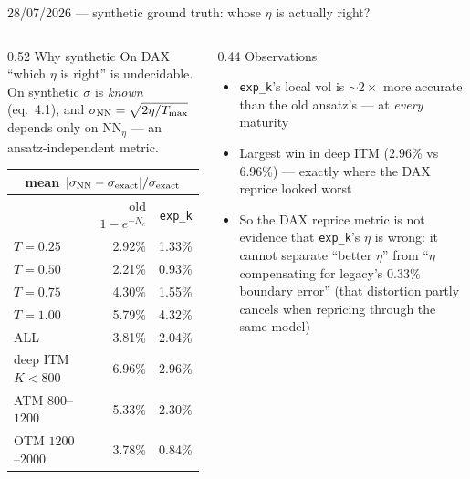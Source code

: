 \documentclass[aspectratio=169,11pt]{beamer}
\newcommand{\gold}[1]{{\color{ntugold}#1}}
\newcommand{\red}[1]{{\color{ntured}#1}}
\begin{document}
\begin{frame}{28/07/2026 --- synthetic ground truth: whose $\eta$ is actually right?}
  \begin{columns}[T]
    \begin{column}{0.52\linewidth}
      \gold{Why synthetic} On DAX ``which $\eta$ is right'' is \red{undecidable}. On synthetic
      $\sigma$ is \emph{known} (eq.\ 4.1), and $\sigma_{\rm NN}=\sqrt{2\eta/T_{\max}}$ depends only on
      $\mathrm{NN}_\eta$ --- an \gold{ansatz-independent} metric.
      \begin{center}\scriptsize
      \begin{tabular}{lrr}
        \multicolumn{3}{c}{mean $|\sigma_{\rm NN}-\sigma_{\rm exact}|/\sigma_{\rm exact}$}\\
        \toprule
        & old $1-e^{-N_c}$ & \texttt{exp\_k} \\
        \midrule
        $T=0.25$ & 2.92\% & \gold{1.33\%} \\
        $T=0.50$ & 2.21\% & \gold{0.93\%} \\
        $T=0.75$ & 4.30\% & \gold{1.55\%} \\
        $T=1.00$ & 5.79\% & \gold{4.32\%} \\
        \midrule
        ALL      & 3.81\% & \red{2.04\%} \\
        \midrule
        deep ITM $K{<}800$ & 6.96\% & \red{2.96\%} \\
        ATM $800$--$1200$  & 5.33\% & \gold{2.30\%} \\
        OTM $1200$--$2000$ & 3.78\% & \gold{0.84\%} \\
        \bottomrule
      \end{tabular}
      \end{center}
    \end{column}
    \begin{column}{0.44\linewidth}
      \gold{Observations}
      \begin{itemize}\small
        \item \texttt{exp\_k}'s local vol is \red{$\sim\!2\times$ more accurate} than the old ansatz's ---
              at \emph{every} maturity
        \item Largest win in \red{deep ITM} ($2.96\%$ vs $6.96\%$) --- exactly where the DAX reprice
              looked worst
        \item So the DAX reprice metric is \red{not} evidence that \texttt{exp\_k}'s $\eta$ is wrong:
              it cannot separate ``better $\eta$'' from ``$\eta$ compensating for legacy's $0.33\%$
              boundary error'' (that distortion partly cancels when repricing through the same model)
      \end{itemize}
    \end{column}
  \end{columns}
\end{frame}
\end{document}
